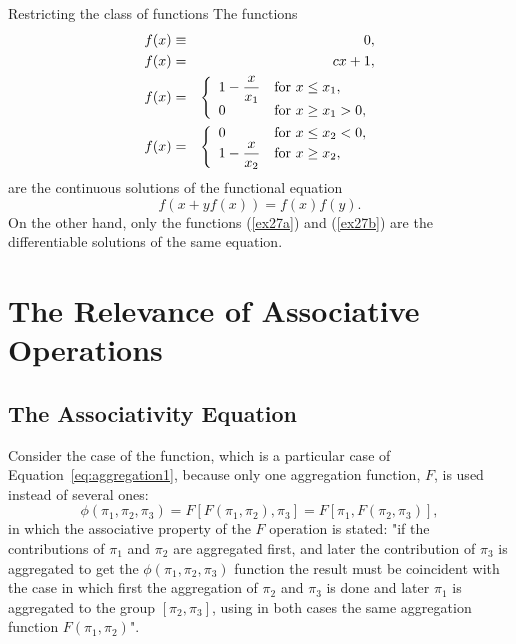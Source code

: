 \documentclass[
	11pt, %
	fleqn, %
	a4paper, %
]{LegrandOrangeBook}
\begin{document}
\begin{example}{Restricting the class of functions}
The functions
\begin{eqnarray}
f(x)& \equiv & 0, \\ \label{ex27a}
f(x)& = & cx+1, \\ \label{ex27b}
f(x)& = & \left\{ \begin{array}{ll} 1-{\displaystyle {x\over{x_1}}} & \mbox{for}\ x\leq x_1,\\
0 & \mbox{for}\ x\geq x_1>0,
\end{array} \right. \\
f(x)& = & \left\{ \begin{array}{ll} 0 & \mbox{for}\ x\leq x_2<0,\\
1-{\displaystyle {x\over{x_2}}} & \mbox{for}\ x\geq x_2,
\end{array} \right.
\end{eqnarray}
are the continuous solutions of the functional equation
\begin{displaymath}
f(x+yf(x))=f(x)f(y).
\end{displaymath}
On the other hand, only the functions (\ref{ex27a}) and (\ref{ex27b}) are the differentiable solutions
of the same equation.
\end{example}


\chapter{The Relevance of Associative Operations}
\label{ch:associative}
\section{The Associativity Equation}

Consider the case of the function, which is a particular case of Equation~\eqref{eq:aggregation1}, because only one aggregation function, $F$, is used instead of several ones:
\begin{equation}
\phi(\pi_1,\pi_2,\pi_3) = F[F(\pi_1,\pi_2),\pi_3] = F[\pi_1,F(\pi_2,\pi_3)],
\label{eq:associativity}
\end{equation}
in which the associative property of the $F$ operation is stated: "if the contributions of $\pi_1$ and $\pi_2$ are aggregated first, and later the contribution of $\pi_3$ is aggregated to get the $\phi(\pi_1, \pi_2, \pi_3)$ function the result must be coincident with the case in which first the aggregation of $\pi_2$ and $\pi_3$ is done and later $\pi_1$ is aggregated to the group $[\pi_2, \pi_3]$, using in both cases the same aggregation function $F(\pi_1, \pi_2)$".
\end{document}
